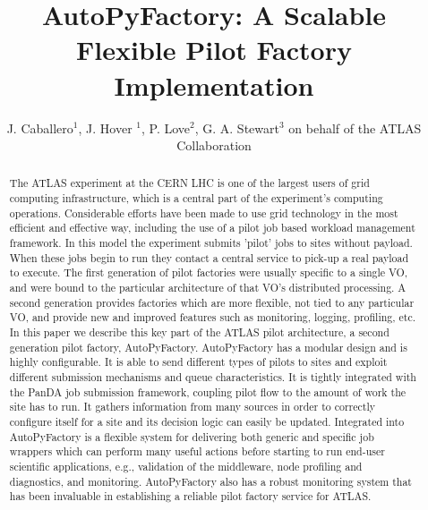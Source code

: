 \documentclass[a4paper]{jpconf}
\begin{document}
\title{AutoPyFactory: A Scalable Flexible Pilot Factory Implementation}

\author{J. Caballero$^1$, J. Hover $^1$, P. Love$^2$, G. A. Stewart$^3$ on behalf of the ATLAS Collaboration} 

\address{$^1$ Brookhaven National Laboratory, PO BOX 5000 Upton, NY 11973, USA}
\address{$^2$ Department of Physics, Lancaster University, Lancaster, LA1 4YB, UK}
\address{$^3$ CERN: European Organization for Nuclear Research, Geneva, Switzerland}


\begin{abstract}

The ATLAS experiment at the CERN LHC is one of the largest users of grid computing
infrastructure, which is a central part of the experiment's computing operations.
Considerable efforts have been made to use grid technology in the most efficient
and effective way, including the use of a pilot job based workload management framework.
In this model the experiment submits 'pilot' jobs to sites without payload. When these
jobs begin to run they contact a central service to pick-up a real payload to execute.
The first generation of pilot factories were usually specific to a single VO, and were
bound to the particular architecture of that VO's distributed processing.
A second generation provides factories which are more flexible, not tied to any particular VO,
and provide new and improved features such as monitoring, logging, profiling, etc.
In this paper we describe this key part of the ATLAS pilot architecture, a second
generation pilot factory, AutoPyFactory.
AutoPyFactory has a modular design and is highly configurable. It is able to send
different types of pilots to sites and exploit different submission mechanisms and queue
characteristics. It is tightly integrated with the PanDA job submission framework,
coupling pilot flow to the amount of work the site has to run. It gathers information
from many sources in order to correctly configure itself for a site and its decision logic
can easily be updated.
Integrated into AutoPyFactory is a flexible system for delivering both generic and
specific job wrappers which can perform many useful actions before starting to run
end-user scientific applications, e.g., validation of the middleware, node profiling
and diagnostics, and monitoring.
AutoPyFactory also has a robust monitoring system that has been invaluable in establishing a
reliable pilot factory service for ATLAS.
\end{abstract}
\end{document}
